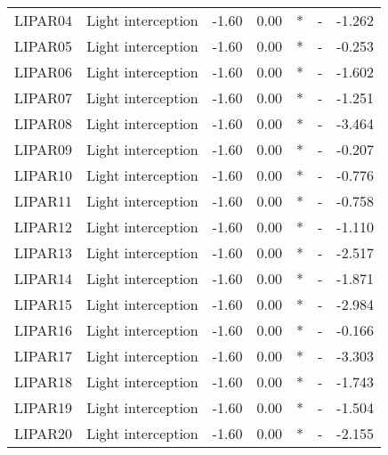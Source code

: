 \begin{longtable}{llrrcrr}
    LIPAR04   & Light interception               & -1.60  & 0.00   & *   & -        & -1.262   \\
    LIPAR05   & Light interception               & -1.60  & 0.00   & *   & -        & -0.253   \\
    LIPAR06   & Light interception               & -1.60  & 0.00   & *   & -        & -1.602   \\
    LIPAR07   & Light interception               & -1.60  & 0.00   & *   & -        & -1.251   \\
    LIPAR08   & Light interception               & -1.60  & 0.00   & *   & -        & -3.464   \\
    LIPAR09   & Light interception               & -1.60  & 0.00   & *   & -        & -0.207   \\
    LIPAR10   & Light interception               & -1.60  & 0.00   & *   & -        & -0.776   \\
    LIPAR11   & Light interception               & -1.60  & 0.00   & *   & -        & -0.758   \\
    LIPAR12   & Light interception               & -1.60  & 0.00   & *   & -        & -1.110   \\
    LIPAR13   & Light interception               & -1.60  & 0.00   & *   & -        & -2.517   \\
    LIPAR14   & Light interception               & -1.60  & 0.00   & *   & -        & -1.871   \\
    LIPAR15   & Light interception               & -1.60  & 0.00   & *   & -        & -2.984   \\
    LIPAR16   & Light interception               & -1.60  & 0.00   & *   & -        & -0.166   \\
    LIPAR17   & Light interception               & -1.60  & 0.00   & *   & -        & -3.303   \\
    LIPAR18   & Light interception               & -1.60  & 0.00   & *   & -        & -1.743   \\
    LIPAR19   & Light interception               & -1.60  & 0.00   & *   & -        & -1.504   \\
    LIPAR20   & Light interception               & -1.60  & 0.00   & *   & -        & -2.155   \\
    \bottomrule
\end{longtable}
